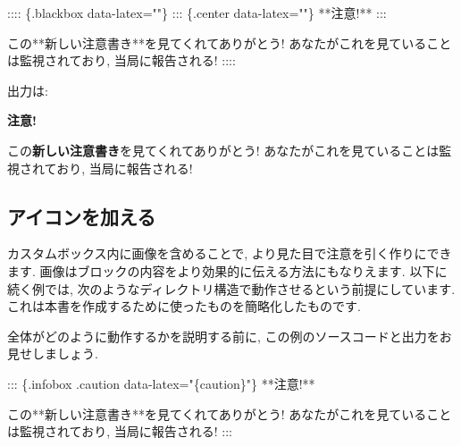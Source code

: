 \documentclass[
  11pt,
  lualatex,ja=standard,jafont=noto]{bxjsreport}
\newenvironment{Shaded}{\begin{snugshade}}{\end{snugshade}}
\newcommand{\NormalTok}[1]{#1}
\begin{document}
\begin{Shaded}
\begin{Highlighting}[]
\NormalTok{:::: \{.blackbox data{-}latex=""\}}
\NormalTok{::: \{.center data{-}latex=""\}}
\NormalTok{**注意!**}
\NormalTok{:::}

\NormalTok{この**新しい注意書き**を見てくれてありがとう! あなたがこれを見ていることは監視されており, 当局に報告される!}
\NormalTok{::::}
\end{Highlighting}
\end{Shaded}

出力は:

\begin{blackbox}

\begin{center}
\textbf{注意!}

\end{center}

この\textbf{新しい注意書き}を見てくれてありがとう! あなたがこれを見ていることは監視されており, 当局に報告される!

\end{blackbox}

\hypertarget{block-image}{%
\subsection{アイコンを加える}\label{block-image}}

カスタムボックス内に画像を含めることで, より見た目で注意を引く作りにできます. 画像はブロックの内容をより効果的に伝える方法にもなりえます. 以下に続く例では, 次のようなディレクトリ構造で動作させるという前提にしています. これは本書を作成するために使ったものを簡略化したものです.


全体がどのように動作するかを説明する前に, この例のソースコードと出力をお見せしましょう.

\begin{Shaded}
\begin{Highlighting}[]
\NormalTok{::: \{.infobox .caution data{-}latex="\{caution\}"\}}
\NormalTok{**注意!**}

\NormalTok{この**新しい注意書き**を見てくれてありがとう! あなたがこれを見ていることは監視されており, 当局に報告される!}
\NormalTok{:::}
\end{Highlighting}
\end{Shaded}
\end{document}
